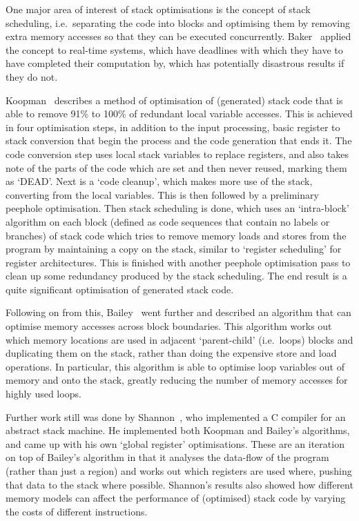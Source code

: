 One major area of interest of stack optimisations is the concept of stack
scheduling, i.e.\ separating the code into blocks and optimising them by
removing extra memory accesses so that they can be executed concurrently.
Baker~\cite{Baker1991Stack} applied the concept to real-time systems, which have
deadlines with which they have to have completed their computation by, which has
potentially disastrous results if they do not.

Koopman~\cite{Koopman1995Preliminary} describes a method of optimisation of
(generated) stack code that is able to remove 91\% to 100\% of redundant local
variable accesses. This is achieved in four optimisation steps, in addition to
the input processing, basic register to stack conversion that begin the process
and the code generation that ends it. The code conversion step uses local stack
variables to replace registers, and also takes note of the parts of the code
which are set and then never reused, marking them as `DEAD'.  Next is a `code
cleanup', which makes more use of the stack, converting from the local
variables. This is then followed by a preliminary peephole optimisation. Then
stack scheduling is done, which uses an `intra-block' algorithm on each block
(defined as code sequences that contain no labels or branches) of stack code
which tries to remove memory loads and stores from the program by maintaining a
copy on the stack, similar to `register scheduling' for register architectures.
This is finished with another peephole optimisation pass to clean up some
redundancy produced by the stack scheduling. The end result is a quite
significant optimisation of generated stack code.

Following on from this, Bailey~\cite{Bailey2000Inter} went further and described
an algorithm that can optimise memory accesses across block boundaries. This
algorithm works out which memory locations are used in adjacent `parent-child'
(i.e.\ loops) blocks and duplicating them on the stack, rather than doing the
expensive store and load operations. In particular, this algorithm is able to
optimise loop variables out of memory and onto the stack, greatly reducing the
number of memory accesses for highly used loops.

Further work still was done by Shannon~\cite{Shannon2006AC}, who implemented a C
compiler for an abstract stack machine. He implemented both Koopman and Bailey's
algorithms, and came up with his own `global register' optimisations. These are
an iteration on top of Bailey's algorithm in that it analyses the data-flow of
the program (rather than just a region) and works out which registers are used
where, pushing that data to the stack where possible. Shannon's results also
showed how different memory models can affect the performance of (optimised)
stack code by varying the costs of different instructions.

